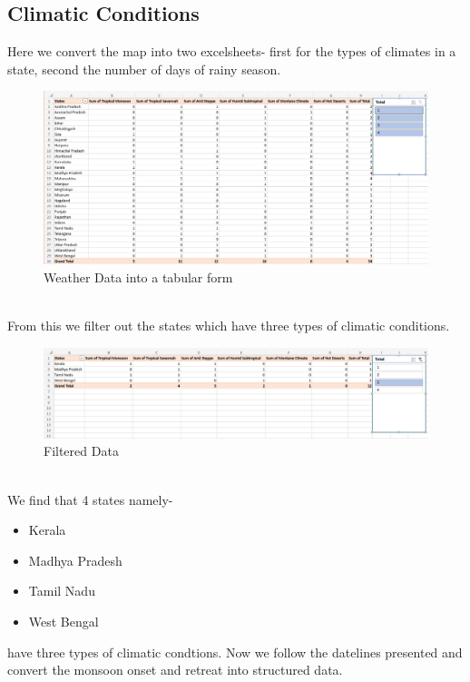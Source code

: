 \documentclass{report}
\begin{document}
\subsection{Climatic Conditions}
Here we convert the map into two excelsheets- first for the types of climates in a state, second the number of days of rainy season.
\begin{Center}
  \begin{figure}[h!]
    \includegraphics[width=1.25\textwidth]{ClimateData.png}
    \caption{Weather Data into a tabular form}
   \end{figure}
 \end{Center}
\\ From this we filter out the states which have three types of climatic conditions.
\begin{Center}
  \begin{figure}[h!]
    \includegraphics[width=1.25\textwidth]{ClimateDataFiltered.png}
    \caption{Filtered Data}
   \end{figure}
 \end{Center}
 \\
 We find that 4 states namely-
\begin{itemize}
    \item Kerala
    \item Madhya Pradesh
    \item Tamil Nadu
    \item West Bengal
  \end{itemize}
have three types of climatic condtions.
\newpage
Now we follow the datelines presented and convert the monsoon onset and retreat into structured data.
\end{document}

